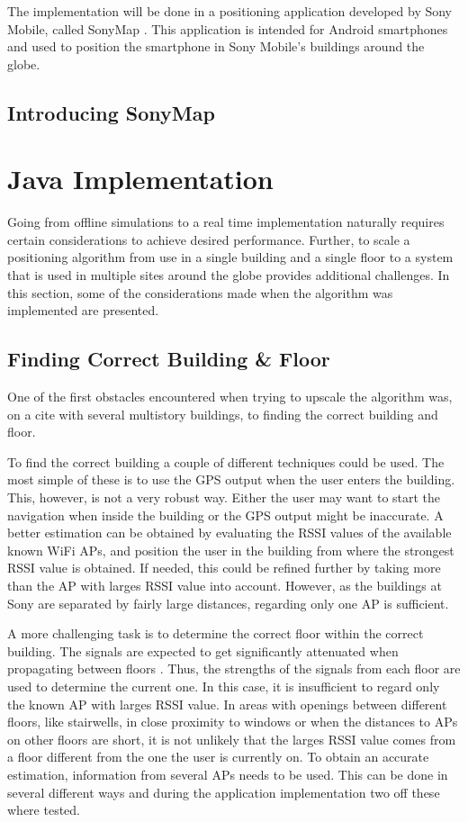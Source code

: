 \documentclass{LTHthesis}
\begin{document}
The implementation will be done in a positioning application developed by Sony Mobile, called SonyMap \cite{sonymap}. This application is intended for Android smartphones and used to  position the smartphone in Sony Mobile's buildings around the globe. 
%
\subsection{Introducing SonyMap}
%
\section{Java Implementation}
%
Going from offline simulations to a real time implementation naturally requires certain considerations to achieve desired performance. Further, to scale a positioning algorithm from use in a single building and a single floor to a system that is used in multiple sites around the globe provides additional challenges. In this section, some of the considerations made when the algorithm was implemented are presented. 
%
\subsection{Finding Correct Building \& Floor}
%
One of the first obstacles encountered when trying to upscale the algorithm was, on a cite with several multistory buildings, to finding the correct building and floor. 

To find the correct building a couple of different techniques could be used. The most simple of these is to use the GPS output when the user enters the building. This, however, is not a very robust way. Either the user may want to start the navigation when inside the building or the GPS output might be inaccurate. A better estimation can be obtained by evaluating the RSSI values of the available known WiFi APs, and position the user in the building from where the strongest RSSI value is obtained. If needed, this could be refined further by taking more than the AP with larges RSSI value into account. However, as the buildings at Sony are separated by fairly large distances, regarding only one AP is sufficient.

A more challenging task is to determine the correct floor within the correct building. The signals are expected to get significantly attenuated when propagating between floors \cite{rappaport96}. Thus, the strengths of the signals from each floor are used to determine the current one. In this case, it is insufficient to regard only the known AP with larges RSSI value. In areas with openings between different floors, like stairwells, in close proximity to windows or when the distances to APs on other floors are short, it is not unlikely that the larges RSSI value comes from a floor different from the one the user is currently on. To obtain an accurate estimation, information from several APs needs to be used. This can be done in several different ways and during the application implementation two off these where tested.
\end{document}
